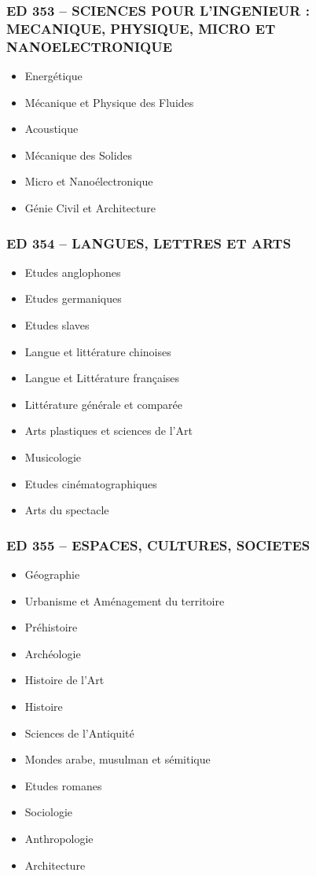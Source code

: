 \subsubsection*{ED 353 -- SCIENCES POUR L'INGENIEUR : MECANIQUE, PHYSIQUE, MICRO ET NANOELECTRONIQUE}\label{ed-353-sciences-pour-lingenieur-mecanique-physique-micro-et-nanoelectronique}

\begin{itemize}
\item
  Energétique
\item
  Mécanique et Physique des Fluides
\item
  Acoustique
\item
  Mécanique des Solides
\item
  Micro et Nanoélectronique
\item
  Génie Civil et Architecture
\end{itemize}

\subsubsection*{ED 354 -- LANGUES, LETTRES ET ARTS}\label{ed-354-langues-lettres-et-arts}

\begin{itemize}
\item
  Etudes anglophones
\item
  Etudes germaniques
\item
  Etudes slaves
\item
  Langue et littérature chinoises
\item
  Langue et Littérature françaises
\item
  Littérature générale et comparée
\item
  Arts plastiques et sciences de l'Art
\item
  Musicologie
\item
  Etudes cinématographiques
\item
  Arts du spectacle
\end{itemize}

\subsubsection*{ED 355 -- ESPACES, CULTURES, SOCIETES}\label{ed-355-espaces-cultures-societes}

\begin{itemize}
\item
  Géographie
\item
  Urbanisme et Aménagement du territoire
\item
  Préhistoire
\item
  Archéologie
\item
  Histoire de l'Art
\item
  Histoire
\item
  Sciences de l'Antiquité
\item
  Mondes arabe, musulman et sémitique
\item
  Etudes romanes
\item
  Sociologie
\item
  Anthropologie
\item
  Architecture
\end{itemize}

